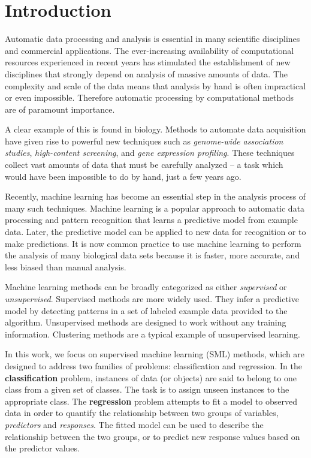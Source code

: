 \chapter{Introduction}

Automatic data processing and analysis is essential in many scientific disciplines and commercial
applications. The ever-increasing availability of computational resources experienced in recent
years has stimulated the establishment of new disciplines that strongly depend on analysis of massive
amounts of data. The complexity and scale of the data means that analysis by hand is often
impractical or even impossible. Therefore automatic processing by computational methods are of
paramount importance.

A clear example of this is found in biology. Methods to automate data acquisition have given rise to
powerful new techniques such as \emph{genome-wide association studies}, \emph{high-content
screening}, and \emph{gene expression profiling}. These techniques collect vast amounts of data that
must be carefully analyzed -- a task which would have been impossible to do by hand, just a few
years ago.

Recently, machine learning has become an essential step in the analysis process of many such
techniques.  Machine learning is a popular approach to automatic data processing and pattern
recognition that learns a predictive model from example data. Later, the predictive model can be
applied to new data for recognition or to make predictions. It is now common practice to use machine
learning to perform the analysis of many biological data sets because it is faster, more accurate,
and less biased than manual analysis.

Machine learning methods can be broadly categorized as either \emph{supervised} or
\emph{unsupervised}. Supervised methods are more widely used. They infer a predictive
model by detecting patterns in a set of labeled example data provided to the algorithm. Unsupervised
methods are designed to work without any training information. Clustering methods are a typical
example of unsupervised learning. 

In this work, we focus on supervised machine learning (SML) methods, which are designed to address
two families of problems: classification and regression. In the {\bf classification} problem,
instances of data (or objects) are said to belong to one class from a given set of classes. The task
is to assign unseen instances to the appropriate class. The {\bf regression} problem attempts to fit
a model to observed data in order to quantify the relationship between two groups of variables,
\emph{predictors} and \emph{responses}. The fitted model can be used to describe the relationship
between the two groups, or to predict new response values based on the predictor values.

